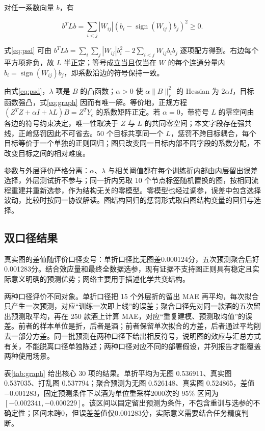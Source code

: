 对任一系数向量 $b$，有

\begin{equation}
b^{T}Lb=\sum_{i<j}|W_{ij}|\left(b_i-\operatorname{sign}(W_{ij})b_j\right)^2\ge0.
\label{eq:psd}
\end{equation}

式\eqref{eq:psd} 可由 $b^{T}Lb=\sum_i\sum_j|W_{ij}|b_i^2-2\sum_{i<j}W_{ij}b_ib_j$ 逐项配方得到。右边每个平方项非负，故 $L$ 半正定；等号成立当且仅当在 $W$ 的每个连通分量内 $b_i=\operatorname{sign}(W_{ij})b_j$，即系数沿边的符号保持一致。

由式\eqref{eq:psd}，$\lambda$ 项是 $B$ 的凸函数；$\alpha>0$ 使 $\alpha\|B\|_F^2$ 的 Hessian 为 $2\alpha I$，目标函数强凸，式\eqref{eq:graph} 因而有唯一解。等价地，正规方程 $(Z^{T}Z+\alpha I+\lambda L)B=Z^{T}Y_c$ 的系数矩阵正定。若 $\alpha=0$，带符号 $L$ 的零空间由各边的符号约束决定，唯一性取决于 $Z$ 与 $L$ 的共同零空间；本文字段存在强共线，正岭惩罚因此不可省去。50 个目标共享同一个 $L$，惩罚不跨目标耦合，每个目标等价于一个单独的正则回归；图只改变同一目标内部不同字段的系数分配，不改变目标之间的相对难度。

参数与外层评价严格分离：$\alpha$、$\lambda$ 与相关阈值都在每个训练折内部由内层留出误差选择，外层测试折不参与；同一折内另取 10 个节点标签随机置换的图，按相同流程重建并重新选参，作为结构无关的零模型。零模型也经过调参，误差中包含选择波动，比较时按同一协议解读。图结构回归的惩罚形式取自图结构变量的回归与选择\cite{li2010}。

\subsection{双口径结果}

真实图的差值随评价口径变号：单折口径比无图差0.000124分，五次预测聚合后好0.001283分。结合效应量和最终全数据选参，现有证据不支持图正则具有稳定且实际意义明确的预测优势；网络主要用于描述化学共变结构。

两种口径评价不同对象。单折口径把 15 个外层折的留出 MAE 再平均，每次拟合只产生一次预测，对应“训练一次即上线”的误差；聚合口径先对同一款酒的五次留出预测取平均，再在 250 款酒上计算 MAE，对应“重复建模、预测取均值”的误差。前者的样本单位是折，后者是酒；前者保留单次拟合的方差，后者通过平均削去一部分方差。同一批预测在两种口径下给出相反符号，说明图的效应与汇总方式有关，不能脱离口径单独陈述；两种口径对应不同的部署假设，并列报告才能覆盖两种使用场景。

表\ref{tab:graph} 给出核心 30 项的结果。单折平均为无图 0.536911、真实图 0.537035、打乱图 0.537794；聚合预测为无图 0.526148、真实图 0.524865，差值 $-0.001283$，固定预测条件下以酒为单位重采样2000次的 95\% 区间为 $[-0.002341,-0.000229]$。该区间以固定留出预测为条件，不包含重训与选参的不确定性；区间未跨0，但误差差值仅0.001283分，实际意义需要结合任务精度判断。


